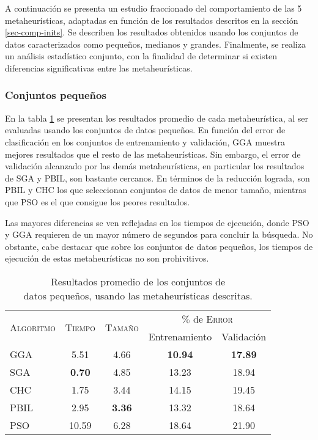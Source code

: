 A continuación se presenta un estudio fraccionado del comportamiento de las 5 metaheurísticas, adaptadas en función de los resultados descritos en la sección \ref{sec-comp-inits}. Se describen los resultados obtenidos usando los conjuntos de datos caracterizados como pequeños, medianos y grandes. Finalmente, se realiza un análisis estadístico conjunto, con la finalidad de determinar si existen diferencias significativas entre las metaheurísticas.

\subsubsection{Conjuntos pequeños}

En la tabla \ref{res-small} se presentan los resultados promedio de cada metaheurística, al ser evaluadas usando los conjuntos de datos pequeños. En función del error de clasificación en los conjuntos de entrenamiento y validación, GGA muestra mejores resultados que el resto de las metaheurísticas. Sin embargo, el error de validación alcanzado por las demás metaheurísticas, en particular los resultados de SGA y PBIL, son bastante cercanos. En términos de la reducción lograda, son PBIL y CHC los que seleccionan conjuntos de datos de menor tamaño, mientras que PSO es el que consigue los peores resultados.

Las mayores diferencias se ven reflejadas en los tiempos de ejecución, donde PSO y GGA requieren de un mayor número de segundos para concluir la búsqueda. No obstante, cabe destacar que sobre los conjuntos de datos pequeños, los tiempos de ejecución de estas metaheurísticas no son prohivitivos.

\begin{table}[h!]
\centering
\begin{tabular}{l c c c c}
\hline
\multirow{2}{*}{\textsc{Algoritmo}}
	& \multirow{2}{*}{\textsc{Tiempo}}
	& \multirow{2}{*}{\textsc{Tamaño}}
	& \multicolumn{2}{c}{$\%$ de \textsc{Error}} \\\cline{4-5}
 & & & \scriptsize{Entrenamiento} & \scriptsize{Validación} \\
\hline
\hline
GGA  &  5.51 & 4.66 & \textbf{10.94} & \textbf{17.89} \\
SGA  & \textbf{0.70} & 4.85 & 13.23 & 18.94 \\
CHC  &  1.75 & 3.44 & 14.15 & 19.45 \\
PBIL &  2.95 & \textbf{3.36} & 13.32 & 18.64 \\
PSO  & 10.59 & 6.28 & 18.64 & 21.90 \\
\hline
\end{tabular}
\caption[Resultados de metaheurísticas usando conjuntos de datos pequeños]{Resultados promedio de los conjuntos de\\datos pequeños, usando las metaheurísticas descritas.}
\label{res-small}
\end{table}

